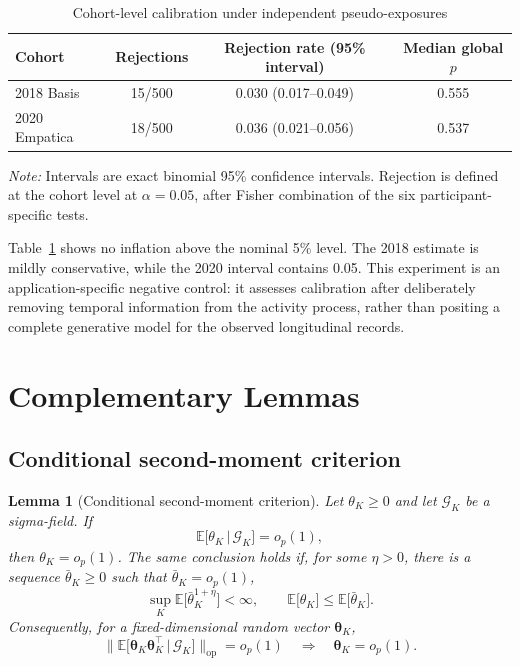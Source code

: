 \documentclass[12pt]{article}
\def\E{\mathbb{E}}
\newtheorem{lemma}[theorem]{Lemma}
\newcommand\given{\,|\,}
\numberwithin{equation}{section}
\begin{document}
\begin{table}[t]
\centering
\caption{Cohort-level calibration under independent pseudo-exposures}
\label{tab:ohiot1dm_pseudo_exposure}
\begin{threeparttable}
\begin{tabular}{lccc}
\toprule
Cohort & Rejections & Rejection rate (95\% interval) & Median global \(p\) \\
\midrule
2018 Basis    & 15/500 & 0.030 (0.017--0.049) & 0.555 \\
2020 Empatica & 18/500 & 0.036 (0.021--0.056) & 0.537 \\
\bottomrule
\end{tabular}

\begin{tablenotes}[flushleft]
\footnotesize
\item \textit{Note:}
Intervals are exact binomial 95\% confidence intervals. Rejection is defined at the cohort level at \(\alpha=0.05\), after Fisher combination of the six participant-specific tests.
\end{tablenotes}
\end{threeparttable}
\end{table}

Table~\ref{tab:ohiot1dm_pseudo_exposure} shows no inflation above the nominal
5\% level.  The 2018 estimate is mildly conservative, while the 2020 interval
contains 0.05.  This experiment is an application-specific negative control:
it assesses calibration after deliberately removing temporal information
from the activity process, rather than positing a complete generative model
for the observed longitudinal records.
\section{Complementary Lemmas}
\label{app:complementary-lemmas}

\subsection{Conditional second-moment criterion}

\begin{lemma}[Conditional second-moment criterion]
\label{lem:conditional-second-moment}
Let \(\theta_K\geq0\) and let \(\mathcal G_K\) be a sigma-field.
If
\[
\E\big[\theta_K\given\mathcal G_K\big]=o_p(1),
\]
then \(\theta_K=o_p(1)\). The same conclusion holds if, for some
\(\eta>0\), there is a sequence \(\bar\theta_K\geq0\) such that
\(\bar\theta_K=o_p(1)\),
\[
\sup_K\E\big[\bar\theta_K^{1+\eta}\big]<\infty,
\qquad
\E\big[\theta_K\big]\leq\E\big[\bar\theta_K\big].
\]
Consequently, for a fixed-dimensional random vector
\(\boldsymbol\theta_K\),
\[
\Big\|
\E\big[\boldsymbol\theta_K\boldsymbol\theta_K^\top
\given\mathcal G_K\big]
\Big\|_{\mathrm{op}}=o_p(1)
\quad\Longrightarrow\quad
\boldsymbol\theta_K=o_p(1).
\]
\end{lemma}
\end{document}

